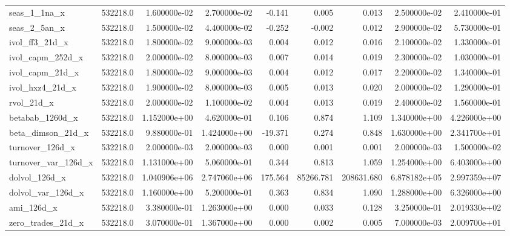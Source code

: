 \documentclass[12pt]{article}
\begin{document}
\begin{landscape}
\begin{longtable}{|l|r|r|r|r|r|r|r|r|}
		seas\_1\_1na\_x          & 532218.0 & 1.600000e-02  & 2.700000e-02 & -0.141     & 0.005       & 0.013       & 2.500000e-02  & 2.410000e-01 \\
		seas\_2\_5an\_x          & 532218.0 & 1.500000e-02  & 4.400000e-02 & -0.252     & -0.002      & 0.012       & 2.900000e-02  & 5.730000e-01 \\
		ivol\_ff3\_21d\_x        & 532218.0 & 1.800000e-02  & 9.000000e-03 & 0.004      & 0.012       & 0.016       & 2.100000e-02  & 1.330000e-01 \\
		ivol\_capm\_252d\_x      & 532218.0 & 2.000000e-02  & 8.000000e-03 & 0.007      & 0.014       & 0.019       & 2.300000e-02  & 1.030000e-01 \\
		ivol\_capm\_21d\_x       & 532218.0 & 1.800000e-02  & 9.000000e-03 & 0.004      & 0.012       & 0.017       & 2.200000e-02  & 1.340000e-01 \\
		ivol\_hxz4\_21d\_x       & 532218.0 & 1.900000e-02  & 8.000000e-03 & 0.005      & 0.013       & 0.020       & 2.000000e-02  & 1.290000e-01 \\
		rvol\_21d\_x             & 532218.0 & 2.000000e-02  & 1.100000e-02 & 0.004      & 0.013       & 0.019       & 2.400000e-02  & 1.560000e-01 \\
		betabab\_1260d\_x        & 532218.0 & 1.152000e+00  & 4.620000e-01 & 0.106      & 0.874       & 1.109       & 1.340000e+00  & 4.226000e+00 \\
		beta\_dimson\_21d\_x     & 532218.0 & 9.880000e-01  & 1.424000e+00 & -19.371    & 0.274       & 0.848       & 1.630000e+00  & 2.341700e+01 \\
		turnover\_126d\_x        & 532218.0 & 2.000000e-03  & 2.000000e-03 & 0.000      & 0.001       & 0.001       & 2.000000e-03  & 1.500000e-02 \\
		turnover\_var\_126d\_x   & 532218.0 & 1.131000e+00  & 5.060000e-01 & 0.344      & 0.813       & 1.059       & 1.254000e+00  & 6.403000e+00 \\
		dolvol\_126d\_x          & 532218.0 & 1.040906e+06  & 2.747060e+06 & 175.564    & 85266.781   & 208631.680  & 6.878182e+05  & 2.997359e+07 \\
		dolvol\_var\_126d\_x     & 532218.0 & 1.160000e+00  & 5.200000e-01 & 0.363      & 0.834       & 1.090       & 1.288000e+00  & 6.326000e+00 \\
		ami\_126d\_x             & 532218.0 & 3.380000e-01  & 1.263000e+00 & 0.000      & 0.033       & 0.128       & 3.250000e-01  & 2.019330e+02 \\
		zero\_trades\_21d\_x     & 532218.0 & 3.070000e-01  & 1.367000e+00 & 0.000      & 0.002       & 0.005       & 7.000000e-03  & 2.009700e+01 \\

\end{longtable}
\end{landscape}
\end{document}
